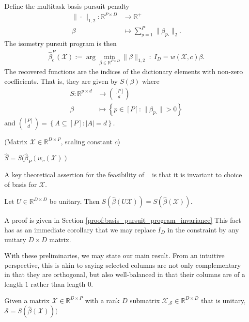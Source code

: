 Define the multitask basis pursuit penalty  %
\begin{align}
\label{eq:bp}
\| \cdot \|_{1,2}: \mathbb R^{P \times D} &\to \mathbb R^+ \\ 
\beta &\mapsto  \sum_{p=1}^P  \|\beta_{p.}\|_2.
\end{align}
The isometry pursuit program is then
\begin{align}
\label{prog:isometry_pursuit}
\widehat \beta^{P}_c (\mathcal X)  := \arg \min_{\beta \in \mathbb R^{P \times D}} \| \beta \|_{1,2} \; : \; I_D = w ({ \mathcal X}, c) \beta.
\end{align}
The recovered functions are the indices of the dictionary elements with non-zero coefficients.
That is, they are given by $S(\beta)$ where 
\begin{align}
S: \mathbb{R}^{p \times d} &\to \binom{[P]}{d} \\
\beta &\mapsto \left\{ p \in [P] :  \|\beta_{p.}\| > 0 \right\}
\end{align}
and $\binom{[P]}{d} = \left\{ A \subseteq [P] : \left|A\right| = d \right\}$. 
\begin{algorithm}[H]
\caption{\isometrypursuit(Matrix $\mathcal X \in \mathbb R^{D\times P}$, scaling constant $c$)}
\begin{algorithmic}[1]
 $\widehat S= S (\widehat \beta_P(w_c(\mathcal X))$ 
\end{algorithmic}
\end{algorithm}

A key theoretical assertion for the feasibility of \isometrypursuit~ is that it is invariant to choice of basis for $\mathcal X$.
\begin{proposition}
\label{prop:basis_pursuit_selection_invariance}
Let $U \in \mathbb R^{D \times D}$ be unitary.
 Then $S(\widehat \beta  (U \mathcal X)) = S(\widehat \beta (\mathcal X))$.
\end{proposition}
A proof is given in Section \ref{proof:basis_pursuit_program_invariance}
This fact has as an immediate corollary that we may replace $I_D$ in the constraint by any unitary $D \times D$ matrix.

With these preliminaries, we may state our main result.
From an intuitive perspective, this is akin to saying selected columns are not only complementary in that they are orthogonal, but also well-balanced in that their columns are of a length $1$ rather than length $0$.
\begin{proposition}
\label{prop:unitary_selection}
Given a matrix $\mathcal X \in \mathbb R^{D \times P}$ with a rank $D$ submatrix $\mathcal X_{.\mathcal S} \in \mathbb R^{D \times D}$ that is unitary, $\mathcal S = S(\widehat{\beta} (\mathcal X)))$
 \end{proposition}
 
